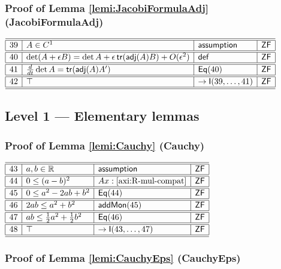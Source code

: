 \documentclass[11pt,reqno]{amsart}
\begin{document}
\medskip

\subsubsection*{Proof of Lemma \ref{lemi:JacobiFormulaAdj} (\textsf{JacobiFormulaAdj})}

\noindent$%
\begin{array}{|r|l|l|l|}
\hline\hline
39 & A\in C^{1} & \mathsf{assumption} & \mathsf{ZF} \\ \hline\hline
40 & \det(A+\epsilon B)=\det A+\epsilon\,\mathsf{tr}(\mathsf{adj}(A)B)+O(\epsilon^{2}) & \mathsf{def} & \mathsf{ZF} \\ \hline\hline
41 & \tfrac{d}{dt}\det A=\mathsf{tr}(\mathsf{adj}(A)A^{\prime}) & \mathsf{Eq}(40) & \mathsf{ZF} \\ \hline\hline
42 & \top & \to\mathsf{I}(39,\dots,41) & \mathsf{ZF} \\ \hline\hline
\end{array}%
$

\medskip

\subsection*{\textsf{Level 1 --- Elementary lemmas}}

\subsubsection*{Proof of Lemma \ref{lemi:Cauchy} (\textsf{Cauchy})}

\noindent$%
\begin{array}{|r|l|l|l|}
\hline\hline
43 & a,b\in\mathbb{R} & \mathsf{assumption} & \mathsf{ZF} \\ \hline\hline
44 & 0\le(a-b)^{2} & Ax:\ref{axi:R-mul-compat} & \mathsf{ZF} \\ \hline\hline
45 & 0\le a^{2}-2ab+b^{2} & \mathsf{Eq}(44) & \mathsf{ZF} \\ \hline\hline
46 & 2ab\le a^{2}+b^{2} & \mathsf{addMon}(45) & \mathsf{ZF} \\ \hline\hline
47 & ab\le\tfrac12 a^{2}+\tfrac12 b^{2} & \mathsf{Eq}(46) & \mathsf{ZF} \\ \hline\hline
48 & \top & \to\mathsf{I}(43,\dots,47) & \mathsf{ZF} \\ \hline\hline
\end{array}%
$

\medskip

\subsubsection*{Proof of Lemma \ref{lemi:CauchyEps} (\textsf{CauchyEps})}
\end{document}
